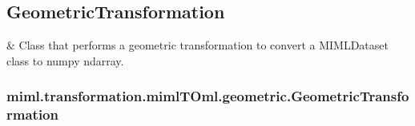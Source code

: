\documentclass[letterpaper,10pt,english]{sphinxmanual}
\begin{document}
\sphinxstepscope


\subsection{GeometricTransformation}
\label{\detokenize{transformation/mimlTOml/geometric:geometrictransformation}}\label{\detokenize{transformation/mimlTOml/geometric::doc}}

\begin{savenotes}\sphinxattablestart
\sphinxthistablewithglobalstyle
\sphinxthistablewithnovlinesstyle
\centering
\begin{tabulary}{\linewidth}[t]{}
\sphinxtoprule
\sphinxtableatstartofbodyhook
\sphinxAtStartPar
{\hyperref[\detokenize{transformation/mimlTOml/_autosummary/miml.transformation.mimlTOml.geometric.GeometricTransformation:miml.transformation.mimlTOml.geometric.GeometricTransformation}]{}}
&
\sphinxAtStartPar
Class that performs a geometric transformation to convert a MIMLDataset class to numpy ndarray.
\\
\sphinxbottomrule
\end{tabulary}
\sphinxtableafterendhook\par
\sphinxattableend\end{savenotes}

\sphinxstepscope


\subsubsection{miml.transformation.mimlTOml.geometric.GeometricTransformation}
\label{\detokenize{transformation/mimlTOml/_autosummary/miml.transformation.mimlTOml.geometric.GeometricTransformation:miml-transformation-mimltoml-geometric-geometrictransformation}}\label{\detokenize{transformation/mimlTOml/_autosummary/miml.transformation.mimlTOml.geometric.GeometricTransformation::doc}}
\end{document}

